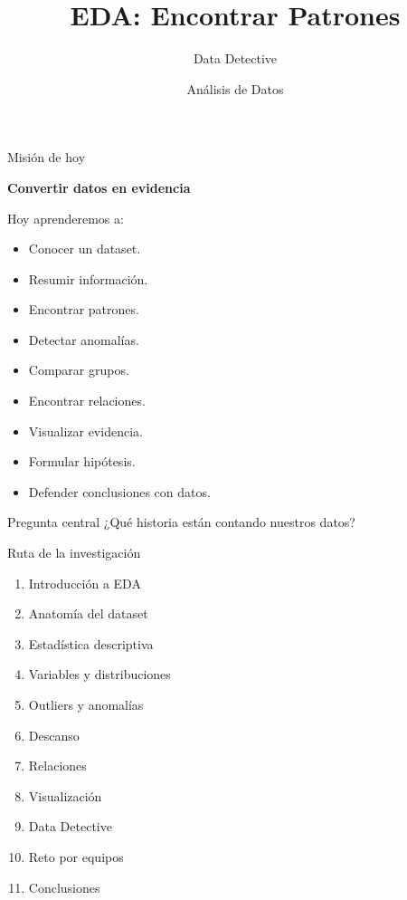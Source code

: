 \documentclass[aspectratio=169,11pt]{beamer}
\title{EDA: Encontrar Patrones}
\subtitle{Data Detective}
\author{Análisis de Datos}
\institute{Universidad Marista}
\date{}
\begin{document}
\begin{frame}
    \titlepage
\end{frame}
\begin{frame}{Misión de hoy}
\begin{center}
\Large
\textbf{Convertir datos en evidencia}
\end{center}
\vspace{0.4cm}
Hoy aprenderemos a:
\begin{itemize}
    \item Conocer un dataset.
    \item Resumir información.
    \item Encontrar patrones.
    \item Detectar anomalías.
    \item Comparar grupos.
    \item Encontrar relaciones.
    \item Visualizar evidencia.
    \item Formular hipótesis.
    \item Defender conclusiones con datos.
\end{itemize}
\vspace{0.3cm}
\begin{alertblock}{Pregunta central}
¿Qué historia están contando nuestros datos?
\end{alertblock}
\end{frame}
\begin{frame}{Ruta de la investigación}
\begin{enumerate}
    \item Introducción a EDA
    \item Anatomía del dataset
    \item Estadística descriptiva
    \item Variables y distribuciones
    \item Outliers y anomalías
    \item Descanso
    \item Relaciones
    \item Visualización
    \item Data Detective
    \item Reto por equipos
    \item Conclusiones
\end{enumerate}
\end{frame}
\end{document}
